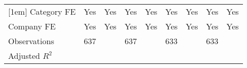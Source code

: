 {\begin{tabular}{l*{8}{c}}
[1em]
Category FE                        &       Yes         &       Yes         &       Yes         &       Yes         &       Yes         &       Yes         &       Yes         &       Yes         \\
[1em]
Company FE                         &       Yes         &       Yes         &       Yes         &       Yes         &       Yes         &       Yes         &       Yes         &       Yes         \\
\hline
Observations                       &       637         &                   &       637         &                   &       633         &                   &       633         &                   \\
Adjusted \(R^{2}\)                 &                   &                   &                   &                   &                   &                   &                   &                   \\
\hline\hline
\end{tabular}
}
